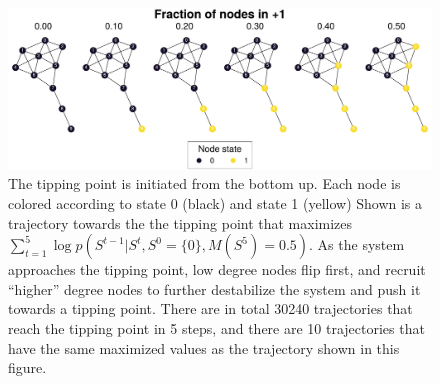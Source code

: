 \documentclass[a4paper, 11pt, twocolumn]{article}
\begin{document}
\begin{figure}
\centering
\includegraphics[width=.9\linewidth]{./figures/kite_maximized_trajectory_30230.pdf}
\caption{\label{fig:max_trajectory}The tipping point is initiated from the bottom up. Each node is colored according to state 0 (black) and state 1 (yellow) Shown is a trajectory towards the the tipping point that maximizes $\sum_{{t=1}}^{{5}} \log p(S^{{t-1}} | S^t, S^0 =\{0\}, M(S^5) = 0.5)$. As the system approaches the tipping point, low degree nodes flip first, and recruit ``higher'' degree nodes to further destabilize the system and push it towards a tipping point. There are in total 30240 trajectories that reach the tipping point in 5 steps, and there are 10 trajectories that have the same maximized values as the trajectory shown in this figure.}
\end{figure}
\end{document}
